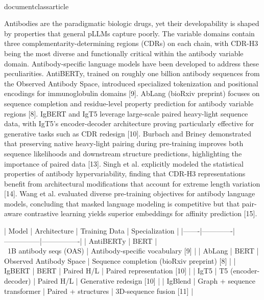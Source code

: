 \\documentclass{article}
\begin{document}
Antibodies are the paradigmatic biologic drugs, yet their developability is shaped by properties that general pLLMs capture poorly. The variable domains contain three complementarity-determining regions (CDRs) on each chain, with CDR-H3 being the most diverse and functionally critical within the antibody variable domain. Antibody-specific language models have been developed to address these peculiarities. AntiBERTy, trained on roughly one billion antibody sequences from the Observed Antibody Space, introduced specialized tokenization and positional encodings for immunoglobulin domains [9]. AbLang (bioRxiv preprint) focuses on sequence completion and residue-level property prediction for antibody variable regions [8]. IgBERT and IgT5 leverage large-scale paired heavy-light sequence data, with IgT5's encoder-decoder architecture proving particularly effective for generative tasks such as CDR redesign [10]. Burbach and Briney demonstrated that preserving native heavy-light pairing during pre-training improves both sequence likelihoods and downstream structure predictions, highlighting the importance of paired data [13]. Singh et al. explicitly modeled the statistical properties of antibody hypervariability, finding that CDR-H3 representations benefit from architectural modifications that account for extreme length variation [14]. Wang et al. evaluated diverse pre-training objectives for antibody language models, concluding that masked language modeling is competitive but that pair-aware contrastive learning yields superior embeddings for affinity prediction [15].

| Model | Architecture | Training Data | Specialization |
|-------|-------------|---------------|----------------|
| AntiBERTy | BERT | \\~1B antibody seqs (OAS) | Antibody-specific vocabulary [9] |
| AbLang | BERT | Observed Antibody Space | Sequence completion (bioRxiv preprint) [8] |
| IgBERT | BERT | Paired H/L | Paired representation [10] |
| IgT5 | T5 (encoder-decoder) | Paired H/L | Generative redesign [10] |
| IgBlend | Graph + sequence transformer | Paired + structures | 3D-sequence fusion [11] |

\subsection{}
\end{document}
